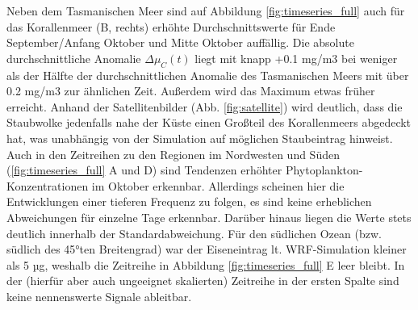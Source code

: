 \documentclass[12pt,a4paper,onecolumn]{scrartcl}
\begin{document}
Neben dem Tasmanischen Meer sind auf Abbildung \ref{fig:timeseries_full} auch für das Korallenmeer (B, rechts) erhöhte Durchschnittswerte für Ende September/Anfang Oktober und Mitte Oktober auffällig. Die absolute durchschnittliche Anomalie $\Delta \mu_C(t)$ liegt mit knapp +0.1 mg/m3 bei weniger als der Hälfte der durchschnittlichen Anomalie des Tasmanischen Meers mit über 0.2 mg/m3 zur ähnlichen Zeit. Außerdem wird das Maximum etwas früher erreicht. Anhand der Satellitenbilder (Abb. \ref{fig:satellite}) wird deutlich, dass die Staubwolke jedenfalls nahe der Küste einen Großteil des Korallenmeers abgedeckt hat, was unabhängig von der Simulation auf möglichen Staubeintrag hinweist. Auch in den Zeitreihen zu den Regionen im Nordwesten und Süden (\ref{fig:timeseries_full} A und D) sind Tendenzen erhöhter Phytoplankton-Konzentrationen im Oktober erkennbar. Allerdings scheinen hier die Entwicklungen einer tieferen Frequenz zu folgen, es sind keine erheblichen Abweichungen für einzelne Tage erkennbar. Darüber hinaus liegen die Werte stets deutlich innerhalb der Standardabweichung. Für den südlichen Ozean (bzw. südlich des 45°ten Breitengrad) war der Eiseneintrag lt. WRF-Simulation kleiner als 5 µg, weshalb die Zeitreihe in Abbildung \ref{fig:timeseries_full} E leer bleibt. In der (hierfür aber auch  ungeeignet skalierten) Zeitreihe in der ersten Spalte sind keine nennenswerte Signale ableitbar.
\end{document}
